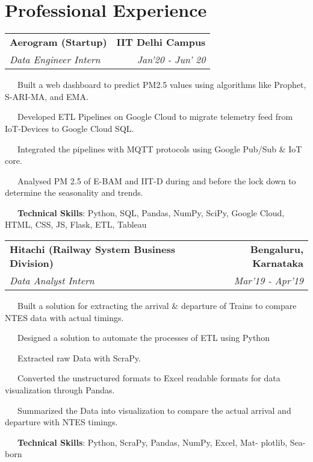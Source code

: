 \documentclass[a4paper,20pt]{article}
\makeatletter
\newcommand{\resumeSubheading}[4]{
  \vspace{-1pt}\item
    \begin{tabular*}{0.97\textwidth}{l@{\extracolsep{\fill}}r}
      \textbf{#1} & #2 \\
      \textit{#3} & \textit{#4} \\
    \end{tabular*}\vspace{-5pt}
}
\makeatother
\begin{document}
\section{Professional Experience}
  \resumeSubheading
      {\textbf{Aerogram (Startup)}}{\textbf{IIT Delhi Campus}}
      {Data Engineer Intern}{Jan'20 - Jun' 20}
    \resumeSubHeadingEnd
     \begin{description}[font=$\bullet$]
        \item {~~~}{Built a web dashboard to predict PM2.5 values using algorithms like Prophet, S-ARI-MA, and EMA.}
        \vspace{-5pt}
        \item {~~~}{Developed ETL Pipelines on Google Cloud to migrate telemetry feed from IoT-Devices to Google Cloud SQL.}
        \vspace{-5pt}
        \item {~~~}{Integrated the pipelines with MQTT protocols using Google Pub/Sub \& IoT core.}
        \vspace{-5pt}
        \item {~~~}{Analysed PM 2.5 of E-BAM and IIT-D during and before the lock down to determine the seasonality and trends.}
        \vspace{-5pt}
        \item {~~~}{\textbf{Technical Skills}: Python, SQL, Pandas, NumPy, SciPy, Google Cloud, HTML, CSS, JS, Flask, ETL, Tableau}
        
    \end{description}
\vspace{-5pt}
    \resumeSubheading
      {\textbf{Hitachi (Railway System Business Division)}}{\textbf{Bengaluru, Karnataka}}
      {Data Analyst Intern}{Mar'19 - Apr'19}
    \resumeSubHeadingEnd
     \begin{description}[font=$\bullet$]
        \item {~~~}{Built a solution for extracting the arrival \& departure of Trains to compare NTES data with actual timings.}
        \vspace{-5pt}
        \item {~~~}{Designed a solution to automate the processes of ETL using Python}
        \vspace{-5pt}
        \item {~~~}{Extracted raw Data with ScraPy.}
        \vspace{-5pt}
        \item {~~~}{Converted the unstructured formats to Excel readable formats for data visualization through Pandas.}
        \vspace{-5pt}
        \item {~~~}{Summarized the Data into visualization to compare the actual arrival and departure with NTES timings.}
        \vspace{-5pt}
        \item {~~~}{\textbf{Technical Skills}: Python, ScraPy, Pandas, NumPy, Excel, Mat- plotlib, Sea-born}
        
    \end{description}
\end{document}

